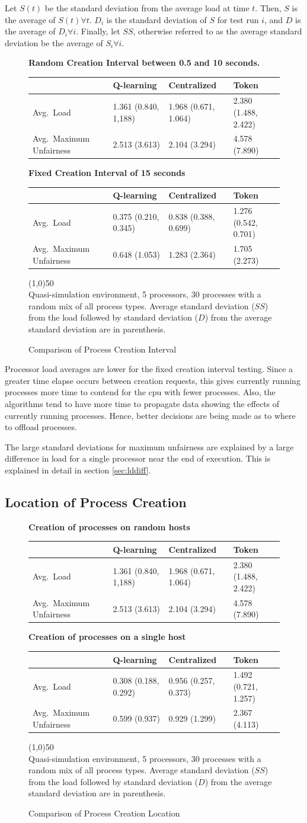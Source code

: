 \documentclass{report}
\newcommand{\algtbl}[6]{
\begin{figure}[H]
\begin{center}
\textbf{#1}
\end{center}

\begin{tabularx}{\linewidth}{|X|X|X|X|} \hline
	& \textbf{Q-learning} & \textbf{Centralized} & \textbf{Token} \\ \hline
	#2
\end{tabularx}

\begin{center}
\textbf{#3}
\end{center}

\begin{tabularx}{\linewidth}{|X|X|X|X|} \hline
	& \textbf{Q-learning} & \textbf{Centralized} & \textbf{Token} \\ \hline
	#4
\end{tabularx}

\vspace{1em}
\line(1,0){50} \\
#5

\caption{#6}
\end{figure}}
\begin{document}
Let $S(t)$ be the standard deviation from the average load at time $t$.
Then, $S$ is the average of $S(t) \forall t$.  $D_i$ is the standard
deviation of $S$ for test run $i$, and $D$ is the average of $D_i \forall
i$.  Finally, let $SS$, otherwise referred to as the average standard
deviation be the average of $S_i \forall i$.

\algtbl{Random Creation Interval between 0.5 and 10 seconds.}
{	Avg.\ Load  & 1.361 (0.840, 1,188) & 1.968 (0.671, 1.064) &
2.380 (1.488, 2.422) \\ \hline
	Avg.\ Maximum Unfairness  & 2.513 (3.613) & 2.104 (3.294) & 4.578 (7.890) \\ \hline
}
{Fixed Creation Interval of 15 seconds}
{	Avg.\ Load & 0.375 (0.210, 0.345) & 0.838 (0.388, 0.699) & 1.276
(0.542, 0.701) \\ \hline
	Avg.\ Maximum Unfairness & 0.648 (1.053) & 1.283 (2.364) & 1.705 (2.273) \\ \hline
}
{Quasi-simulation environment, 5 processors, 30 processes with a random mix
of all process types.  Average standard deviation ($SS$) from the load
followed by standard deviation ($D$) from the average standard deviation
are in parenthesis.} 
{Comparison of Process Creation Interval}


Processor load averages are lower for the fixed creation interval testing.
Since a greater time elapse occurs between creation requests, this gives
currently running processes more time to contend for the cpu with fewer
processes.  Also, the algorithms tend to have more time to propagate data
showing the effects of currently running processes.  Hence, better decisions
are being made as to where to offload processes.

The large standard deviations for maximum unfairness are explained by a
large difference in load for a single processor near the end of execution.
This is explained in detail in section \ref{sec:lddiff}.

\subsection{Location of Process Creation}

\algtbl{Creation of processes on random hosts}
{	Avg.\ Load  & 1.361 (0.840, 1,188) & 1.968 (0.671, 1.064) &
2.380 (1.488, 2.422) \\ \hline
	Avg.\ Maximum Unfairness  & 2.513 (3.613) & 2.104 (3.294) & 4.578 (7.890) \\ \hline
}
{Creation of processes on a single host}
{	Avg.\ Load & 0.308 (0.188, 0.292) & 0.956 (0.257, 0.373) & 1.492
(0.721, 1.257) \\ \hline
	Avg.\ Maximum Unfairness & 0.599 (0.937) & 0.929 (1.299) & 2.367 (4.113) \\ \hline
}
{Quasi-simulation environment, 5 processors, 30 processes with a random mix
of all process types.  Average standard deviation ($SS$) from the load
followed by standard deviation ($D$) from the average standard deviation
are in parenthesis.} 
{Comparison of Process Creation Location}
\end{document}
